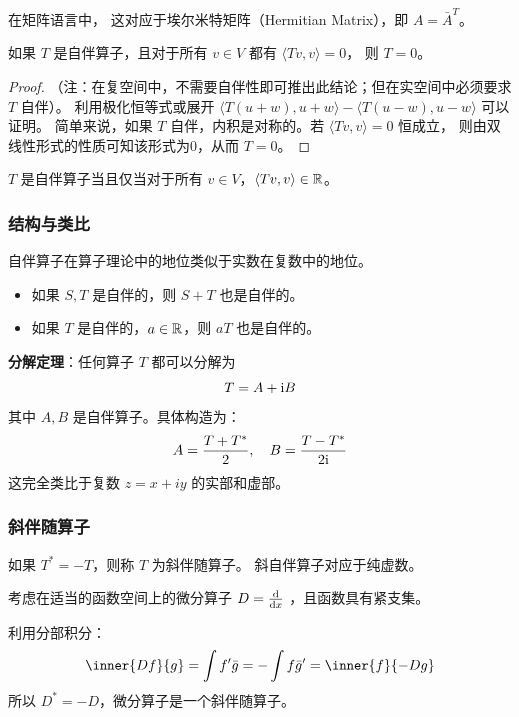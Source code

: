 在矩阵语言中，
这对应于埃尔米特矩阵（Hermitian Matrix），即 \(A = \bar{A}^T\)。

\begin{theorem}
    如果 \(T\) 是自伴算子，且对于所有 \(v \in V\) 都有 \(\langle Tv, v \rangle = 0\)，
    则 \(T = 0\)。
\end{theorem}
\begin{proof}
    （注：在复空间中，不需要自伴性即可推出此结论；但在实空间中必须要求 \(T\) 自伴）。
    利用极化恒等式或展开 \(\langle T(u+w), u+w \rangle - \langle T(u-w), u-w
    \rangle\) 可以证明。
    简单来说，如果 \(T\) 自伴，内积是对称的。若 \(\langle Tv, v \rangle = 0\) 恒成立，
    则由双线性形式的性质可知该形式为0，从而 \(T=0\)。
\end{proof}

\begin{theorem}
    \(T\) 是自伴算子当且仅当对于所有 \(v \in V\)，\(\langle Tv, v \rangle \in \mathbb{R}\)。
\end{theorem}

\subsubsection{结构与类比}
自伴算子在算子理论中的地位类似于实数在复数中的地位。
\begin{itemize}
    \item 如果 \(S, T\) 是自伴的，则 \(S+T\) 也是自伴的。
    \item 如果 \(T\) 是自伴的，\(a \in \mathbb{R}\)，则 \(aT\) 也是自伴的。
\end{itemize}

\textbf{分解定理}：任何算子 \(T\) 都可以分解为
\[
    T = A + \mathrm{i} B
\]
其中 \(A, B\) 是自伴算子。具体构造为：
\[
    A = \frac{T + T^*}{2}, \quad B = \frac{T - T^*}{2\mathrm{i}}
\]
这完全类比于复数 \(z = x + iy\) 的实部和虚部。

\subsubsection{斜伴随算子}
如果 \(T^* = -T\)，则称 \(T\) 为斜伴随算子。
斜自伴算子对应于纯虚数。

\begin{example}
    考虑在适当的函数空间上的微分算子 \(D = \odv{}{x}\) ，且函数具有紧支集。

    利用分部积分：
    \[
        \inner{Df}{g} = \int f' \bar{g} = -\int f \bar{g}' =
        \inner{f}{-Dg}
    \]
    所以 \(D^* = -D\)，微分算子是一个斜伴随算子。
\end{example}


